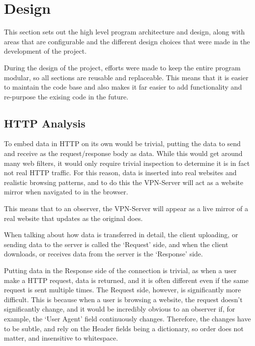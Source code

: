 \section{Design}
This section sets out the high level program architecture and design, along with areas that are configurable and the different design choices that were made in the development of the project.

During the design of the project, efforts were made to keep the entire program modular, so all sections are reusable and replaceable. This means that it is easier to maintain the code base and also makes it far easier to add functionality and re-purpose the exising code in the future.
\subsection{HTTP Analysis}
To embed data in HTTP on its own would be trivial, putting the data to send and receive as the request/response body as data. While this would get around many web filters, it would only require trivial inspection to determine it is in fact not real HTTP traffic.
For this reason, data is inserted into real websites and realistic browsing patterns, and to do this the VPN-Server will act as a website mirror when navigated to in the browser.

This means that to an observer, the VPN-Server will appear as a live mirror of a real website that updates as the original does.

When talking about how data is transferred in detail, the client uploading, or sending data to the server is called the `Request' side, and when the client downloads, or receives data from the server is the `Response' side.

Putting data in the Response side of the connection is trivial, as when a user make a HTTP request, data is returned, and it is often different even if the same request is sent multiple times.
The Request side, however, is significantly more difficult. This is because when a user is browsing a website, the request doesn't significantly change, and it would be incredibly obvious to an observer if, for example, the `User Agent' field continuously changes. Therefore, the changes have to be subtle, and rely on the Header fields being a dictionary, so order does not matter, and insensitive to whitespace.

\newpage
